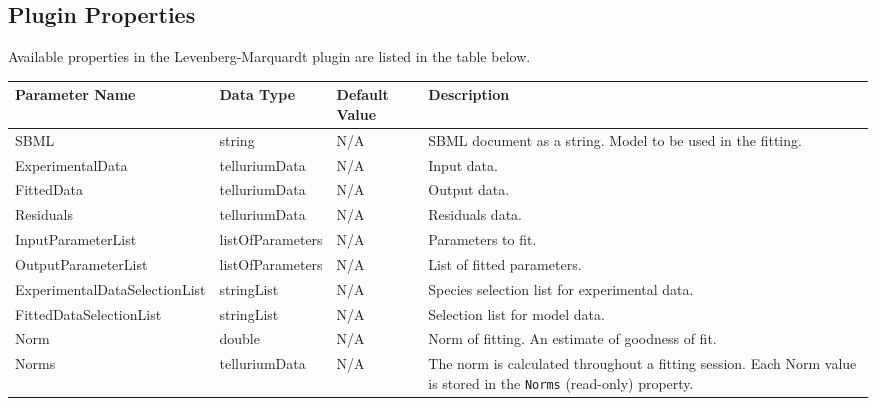 \begin{landscape}
\section{Plugin Properties}
Available properties in the Levenberg-Marquardt plugin are listed in the table below.

\centering %
\begin{longtable}{p{4cm} l p{3cm}  p{10cm}} %

Parameter Name & Data Type & Default Value  & Description \\ [0.5ex] %
\hline %
SBML                            &   string              & N/A    &   SBML document as a string. Model to be used in the fitting. \\
ExperimentalData   				&	telluriumData 		& N/A    &   Input data.  \\
FittedData      				& 	telluriumData    	& N/A    &   Output data. \\
Residuals     					& 	telluriumData    	& N/A    &   Residuals data.  \\
InputParameterList 				&	listOfParameters    & N/A    &   Parameters to fit. \\
OutputParameterList 			&   listOfParameters 	& N/A    &   List of fitted parameters. \\
Experimental\-DataSelectionList & 	stringList			& N/A    &   Species selection list for experimental data. \\
FittedDataSelectionList     	& 	stringList			& N/A    &   Selection list for model data. \\
Norm							&	double				& N/A    &   Norm of fitting. An estimate of goodness of fit. \\

Norms							&	telluriumData		& N/A    &   
The norm is calculated throughout a fitting session. Each Norm value is stored in the \verb|Norms| (read-only) property.
\\


\end{longtable}
\end{landscape}
